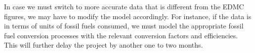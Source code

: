 \documentclass[14pt,a4paper]{article} %
\begin{document}
In case we must switch to more accurate data that is different from the EDMC figures, we may have to modify the model accordingly. For instance, if the data is in terms of units of fossil fuels consumed, we must model the appropriate fossil fuel conversion processes with the relevant conversion factors and efficiencies. This will further delay the project by another one to two months.









\end{document}
